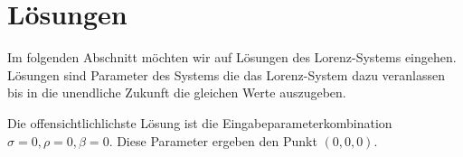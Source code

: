 
\section{Lösungen} %
Im folgenden Abschnitt möchten wir auf Lösungen des Lorenz-Systems eingehen. Lösungen sind Parameter des Systems die das Lorenz-System dazu veranlassen bis in die unendliche Zukunft die gleichen Werte auszugeben.

Die offensichtlichlichste Lösung ist die Eingabeparameterkombination $ \sigma = 0, \rho = 0, \beta = 0 $. Diese Parameter ergeben den Punkt $ (0, 0, 0) $.
